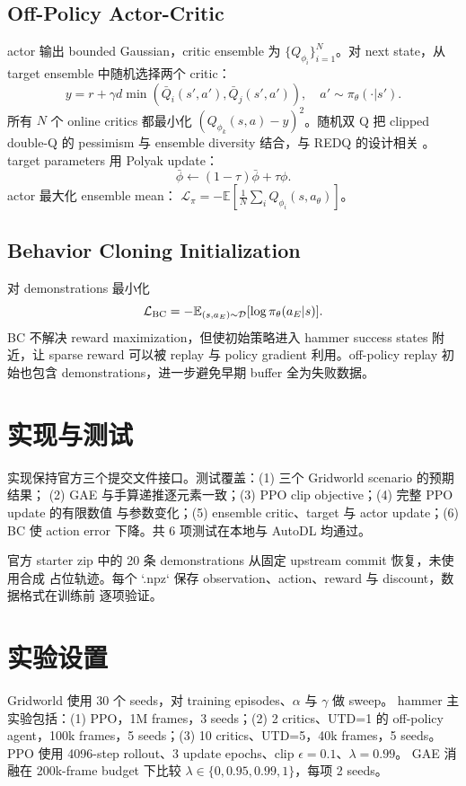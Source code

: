 \documentclass[10pt,twocolumn,a4paper]{ctexart}
\begin{document}
\subsection{Off-Policy Actor-Critic}
actor 输出 bounded Gaussian，critic ensemble 为
$\{Q_{\phi_i}\}_{i=1}^{N}$。对 next state，从 target ensemble 中随机选择两个 critic：
\[
y=r+\gamma d\min\left(
\bar Q_i(s',a'),\bar Q_j(s',a')
\right),\quad a'\sim\pi_\theta(\cdot|s').
\]
所有 $N$ 个 online critics 都最小化 $(Q_{\phi_k}(s,a)-y)^2$。随机双 Q 把
clipped double-Q 的 pessimism 与 ensemble diversity 结合，与 REDQ 的设计相关
\citep{fujimoto2018td3,chen2021redq}。target parameters 用 Polyak update：
\[
\bar\phi\leftarrow(1-\tau)\bar\phi+\tau\phi.
\]
actor 最大化 ensemble mean：
$\mathcal L_{\pi}=-\mathbb E[\frac1N\sum_iQ_{\phi_i}(s,a_\theta)]$。

\subsection{Behavior Cloning Initialization}
对 demonstrations 最小化
\[
\mathcal L_{\rm BC}=-\mathbb E_{(s,a_E)\sim\mathcal D}
[\log\pi_\theta(a_E|s)].
\]
BC 不解决 reward maximization，但使初始策略进入 hammer success states 附近，让
sparse reward 可以被 replay 与 policy gradient 利用。off-policy replay 初始也包含
demonstrations，进一步避免早期 buffer 全为失败数据。

\section{实现与测试}
实现保持官方三个提交文件接口。测试覆盖：(1) 三个 Gridworld scenario 的预期结果；
(2) GAE 与手算递推逐元素一致；(3) PPO clip objective；(4) 完整 PPO update 的有限数值
与参数变化；(5) ensemble critic、target 与 actor update；(6) BC 使 action error
下降。共 6 项测试在本地与 AutoDL 均通过。

官方 starter zip 中的 20 条 demonstrations 从固定 upstream commit 恢复，未使用合成
占位轨迹。每个 `.npz` 保存 observation、action、reward 与 discount，数据格式在训练前
逐项验证。

\section{实验设置}
Gridworld 使用 30 个 seeds，对 training episodes、$\alpha$ 与 $\gamma$ 做 sweep。
hammer 主实验包括：(1) PPO，1M frames，3 seeds；(2) 2 critics、UTD=1 的
off-policy agent，100k frames，5 seeds；(3) 10 critics、UTD=5，40k frames，5 seeds。
PPO 使用 4096-step rollout、3 update epochs、clip $\epsilon=0.1$、$\lambda=0.99$。
GAE 消融在 200k-frame budget 下比较
$\lambda\in\{0,0.95,0.99,1\}$，每项 2 seeds。
\end{document}
